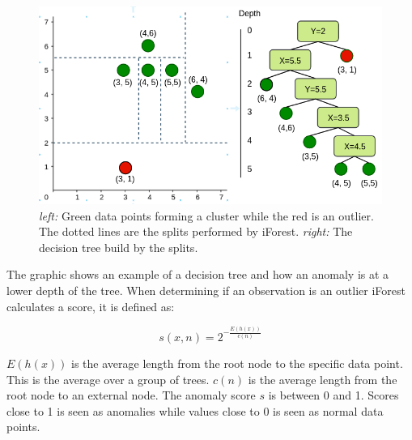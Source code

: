 \begin{figure}
  \centering
  \includegraphics[width=\linewidth]{images/rich_sketch_original.png}
  \caption{\textit{left:} Green data points forming a cluster while the red is an outlier. The dotted lines are the splits performed by iForest. \textit{right:} The decision tree build by the splits.}
  \label{fig:rich_sketch_original}
\end{figure}

The graphic shows an example of a decision tree and how an anomaly is at a lower depth of the tree. When determining if an observation is an outlier iForest calculates a score, it is defined as:

\begin{equation}
  s(x,n) = 2^{-\frac{E(h(x))}{c(n)}}
  \label{eq:org_score}
\end{equation}

$E(h(x))$ is the average length from the root node to the specific data point. This is the average over a group of trees. $c(n)$ is the average length from the root node to an external node. The anomaly score $s$ is between 0 and 1.
Scores close to 1 is seen as anomalies while values close to 0 is seen as normal data points.
